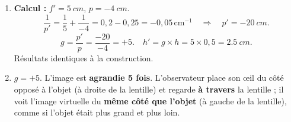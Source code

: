 \documentclass[11pt]{article}
\begin{document}
\begin{corrige}
\begin{enumerate}
    \item \textbf{Calcul :} $f' = \SI{5}{cm}$, $p = \SI{-4}{cm}$.
    \[ \frac{1}{p'} = \frac{1}{5} + \frac{1}{-4} = 0,2 - 0,25 = -0,05\,\text{cm}^{-1} \quad\Rightarrow\quad p' = \SI{-20}{cm}. \]
    \[ g = \frac{p'}{p} = \frac{-20}{-4} = +5. \quad h' = g \times h = 5 \times 0,5 = \SI{2,5}{cm}. \]
    Résultats identiques à la construction.
    \item $g = +5$. L'image est \textbf{agrandie 5 fois}. L'observateur place son œil du côté opposé à l'objet (à droite de la lentille) et regarde \textbf{à travers} la lentille ; il voit l'image virtuelle du \textbf{même côté que l'objet} (à gauche de la lentille), comme si l'objet était plus grand et plus loin.
\end{enumerate}
\end{corrige}
\end{document}
